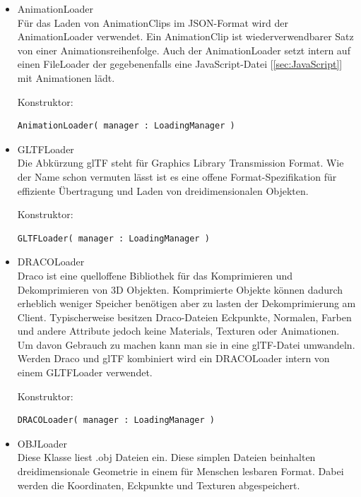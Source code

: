 \begin{itemize}
    
    \item AnimationLoader \cite{three.js_AnimationLoader}\\
    Für das Laden von AnimationClips im JSON-Format wird der AnimationLoader verwendet. Ein AnimationClip ist wiederverwendbarer Satz von einer Animationsreihenfolge. Auch der AnimationLoader setzt intern auf einen FileLoader der gegebenenfalls eine JavaScript-Datei [\ref{sec:JavaScript}] mit Animationen lädt. 
    
    Konstruktor:
    \begin{lstlisting}
AnimationLoader( manager : LoadingManager )
    \end{lstlisting}
    
    \item GLTFLoader \cite{three.js_GLTFLoader}\\
    Die Abkürzung glTF steht für Graphics Library Transmission Format. Wie der Name schon vermuten lässt ist es eine offene Format-Spezifikation für effiziente Übertragung und Laden von dreidimensionalen Objekten.
    
    Konstruktor:
    \begin{lstlisting}
GLTFLoader( manager : LoadingManager )
    \end{lstlisting}
    
    \item DRACOLoader \label{dracoloader} \cite{three.js_DRACOLoader}\\
    Draco ist eine quelloffene Bibliothek für das Komprimieren und Dekomprimieren von 3D Objekten. Komprimierte Objekte können dadurch erheblich weniger Speicher benötigen aber zu lasten der Dekomprimierung am Client. Typischerweise besitzen Draco-Dateien Eckpunkte, Normalen, Farben und andere Attribute jedoch keine Materials, Texturen oder Animationen. Um davon Gebrauch zu machen kann man sie in eine glTF-Datei umwandeln. Werden Draco und glTF kombiniert wird ein DRACOLoader intern von einem GLTFLoader verwendet. 

    Konstruktor:
    \begin{lstlisting}
DRACOLoader( manager : LoadingManager )
    \end{lstlisting}
    
    \item OBJLoader \cite{three.js_OBJLoader}\\
    Diese Klasse liest .obj Dateien ein. Diese simplen Dateien beinhalten dreidimensionale Geometrie in einem für Menschen lesbaren Format. Dabei werden die Koordinaten, Eckpunkte und Texturen abgespeichert. 
    

\end{itemize}
